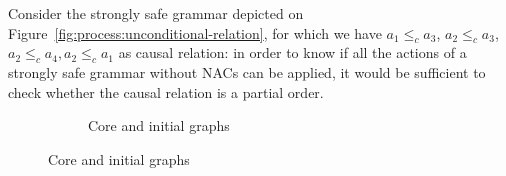 \begin{example}\label{ex:process:existential-relation-fail2} Consider the strongly safe grammar depicted on Figure~\ref{fig:process:unconditional-relation}, for which we have $a_1 \leq_c a_3$, $a_2 \leq_c a_3$, $a_2 \leq_c a_4, a_2 \leq_c a_1$ as causal relation: in order to know if all the actions of a strongly safe grammar without NACs can be applied, it would be sufficient to check whether the causal relation is a partial order.

\begin{figure}[!ht]
  \centering
  \begin{subfigure}[t]{.5\textwidth}
    \centerline{}
    \caption{Core and initial graphs}\label{fig:process:unconditional-relation:core-graph}
  \end{subfigure}


\end{figure}
\end{example}
